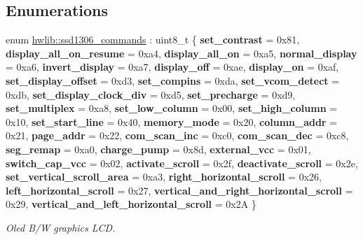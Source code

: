 \subsection*{Enumerations}
\begin{DoxyCompactItemize}
\item 
enum \hyperlink{namespacehwlib_a9dcd26ad4dc21c1a72b57fb76f65e811}{hwlib\+::ssd1306\+\_\+commands} \+: uint8\+\_\+t \{ \newline
{\bfseries set\+\_\+contrast} = 0x81, 
{\bfseries display\+\_\+all\+\_\+on\+\_\+resume} = 0xa4, 
{\bfseries display\+\_\+all\+\_\+on} = 0xa5, 
{\bfseries normal\+\_\+display} = 0xa6, 
\newline
{\bfseries invert\+\_\+display} = 0xa7, 
{\bfseries display\+\_\+off} = 0xae, 
{\bfseries display\+\_\+on} = 0xaf, 
{\bfseries set\+\_\+display\+\_\+offset} = 0xd3, 
\newline
{\bfseries set\+\_\+compins} = 0xda, 
{\bfseries set\+\_\+vcom\+\_\+detect} = 0xdb, 
{\bfseries set\+\_\+display\+\_\+clock\+\_\+div} = 0xd5, 
{\bfseries set\+\_\+precharge} = 0xd9, 
\newline
{\bfseries set\+\_\+multiplex} = 0xa8, 
{\bfseries set\+\_\+low\+\_\+column} = 0x00, 
{\bfseries set\+\_\+high\+\_\+column} = 0x10, 
{\bfseries set\+\_\+start\+\_\+line} = 0x40, 
\newline
{\bfseries memory\+\_\+mode} = 0x20, 
{\bfseries column\+\_\+addr} = 0x21, 
{\bfseries page\+\_\+addr} = 0x22, 
{\bfseries com\+\_\+scan\+\_\+inc} = 0xc0, 
\newline
{\bfseries com\+\_\+scan\+\_\+dec} = 0xc8, 
{\bfseries seg\+\_\+remap} = 0xa0, 
{\bfseries charge\+\_\+pump} = 0x8d, 
{\bfseries external\+\_\+vcc} = 0x01, 
\newline
{\bfseries switch\+\_\+cap\+\_\+vcc} = 0x02, 
{\bfseries activate\+\_\+scroll} = 0x2f, 
{\bfseries deactivate\+\_\+scroll} = 0x2e, 
{\bfseries set\+\_\+vertical\+\_\+scroll\+\_\+area} = 0xa3, 
\newline
{\bfseries right\+\_\+horizontal\+\_\+scroll} = 0x26, 
{\bfseries left\+\_\+horizontal\+\_\+scroll} = 0x27, 
{\bfseries vertical\+\_\+and\+\_\+right\+\_\+horizontal\+\_\+scroll} = 0x29, 
{\bfseries vertical\+\_\+and\+\_\+left\+\_\+horizontal\+\_\+scroll} = 0x2A
 \}\begin{DoxyCompactList}\small\item\em Oled B/W graphics L\+CD. \end{DoxyCompactList}
\end{DoxyCompactItemize}

